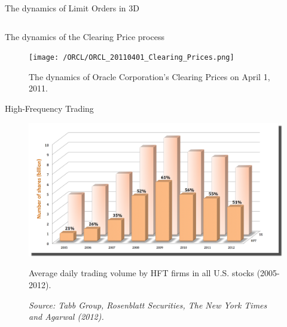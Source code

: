 \documentclass{beamer}
\begin{document}
\begin{frame}[shrink=40]{{\color{cyan}The dynamics of Limit Orders in 3D}}
\begin{columns}
\end{columns}

\end{frame}

\begin{frame}[shrink=30]{{\color{cyan}The dynamics of the Clearing Price process}}
\bigskip
\begin{figure}[H]
\begin{center}
	\texttt{[image: /ORCL/ORCL\_20110401\_Clearing\_Prices.png]}
\caption{The dynamics of Oracle Corporation's Clearing Prices on April 1, 2011.}
\label{fig:the_dynamics_ORCL_pi_20110401}
\end{center}
\end{figure}
\end{frame}

\begin{frame}[shrink=30]{{\color{cyan}High-Frequency Trading}}
\bigskip
\begin{figure}[H]
\begin{center}
	\includegraphics[height=0.9\textheight]{HFT_US_20052012.png}
\caption{Average daily trading volume by HFT firms in all U.S. stocks (2005-2012).}
\vspace{-10pt}
\caption*{{\footnotesize \textit{Source: Tabb Group, Rosenblatt Securities, The New York Times and Agarwal (2012).}}}
\label{fig:HFT_volume}
\end{center}
\end{figure}
\end{frame}

\end{document}
